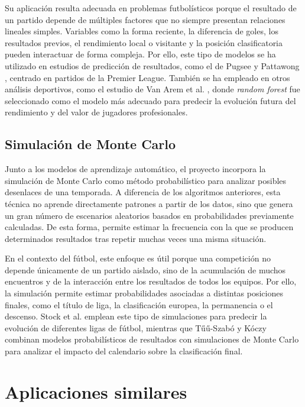 Su aplicación resulta adecuada en problemas futbolísticos porque el resultado de un partido depende de múltiples factores que no siempre presentan relaciones lineales simples. Variables como la forma reciente, la diferencia de goles, los resultados previos, el rendimiento local o visitante y la posición clasificatoria pueden interactuar de forma compleja. Por ello, este tipo de modelos se ha utilizado en estudios de predicción de resultados, como el de Pugsee y Pattawong \cite{pugsee_football_2019}, centrado en partidos de la Premier League. También se ha empleado en otros análisis deportivos, como el estudio de Van Arem et al. \cite{arem_forecasting_2025}, donde \textit{random forest} fue seleccionado como el modelo más adecuado para predecir la evolución futura del rendimiento y del valor de jugadores profesionales.

\subsection{Simulación de Monte Carlo}

Junto a los modelos de aprendizaje automático, el proyecto incorpora la simulación de Monte Carlo como método probabilístico para analizar posibles desenlaces de una temporada. A diferencia de los algoritmos anteriores, esta técnica no aprende directamente patrones a partir de los datos, sino que genera un gran número de escenarios aleatorios basados en probabilidades previamente calculadas. De esta forma, permite estimar la frecuencia con la que se producen determinados resultados tras repetir muchas veces una misma situación.

En el contexto del fútbol, este enfoque es útil porque una competición no depende únicamente de un partido aislado, sino de la acumulación de muchos encuentros y de la interacción entre los resultados de todos los equipos. Por ello, la simulación permite estimar probabilidades asociadas a distintas posiciones finales, como el título de liga, la clasificación europea, la permanencia o el descenso. Stock et al. \cite{stock_physics-based_2022} emplean este tipo de simulaciones para predecir la evolución de diferentes ligas de fútbol, mientras que Tűű-Szabó y Kóczy \cite{tuu-szabo_monte_2026} combinan modelos probabilísticos de resultados con simulaciones de Monte Carlo para analizar el impacto del calendario sobre la clasificación final.
\section{Aplicaciones similares} 

